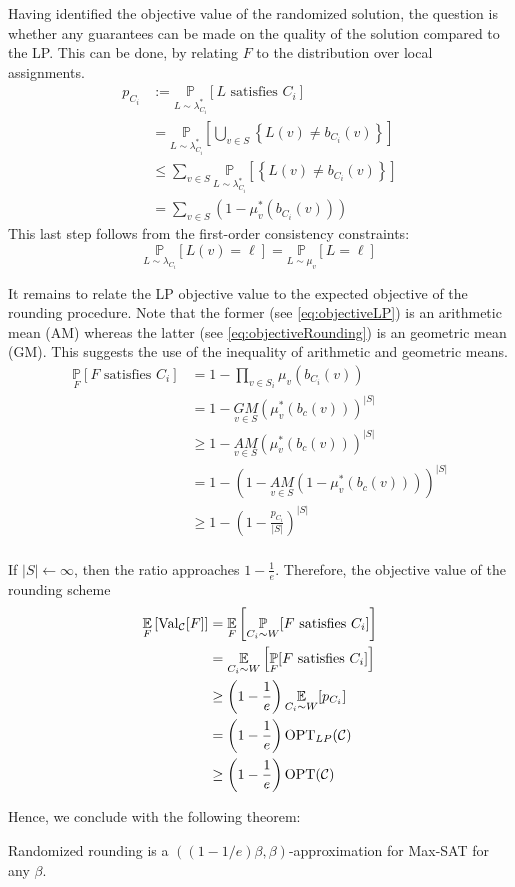 Having identified the objective value of the randomized solution, the question is whether any guarantees can be made on the quality of the solution compared to the LP. 
This can be done, by relating $F$ to the distribution over local assignments.
\begin{align}
	p_{C_i} &:= \underset{L \sim \lambda_{C_i}^*}{\mathbb{P}} [L \text{ satisfies } C_i] \nonumber\\
			&=  \underset{L \sim \lambda_{C_i}^*}{\mathbb{P}}\left[ \bigcup_{v \in S} \left\{ L(v) \neq b_{C_i}(v) \right\} \right] \nonumber\\
			&\le \sum_{v \in  S } \underset{L \sim \lambda_{C_i}^*}{\mathbb{P}} \left[  \left\{ L(v) \neq b_{C_i}(v) \right\} \right] \nonumber\\
			&= \sum_{v \in S} \left( 1 - \mu_v^*(b_{C_i}(v)) \right) \label{eq:objectiveLP}
\end{align}
This last step follows from the first-order consistency constraints:
\[
	\underset{L \sim \lambda_{C_i} }{\mathbb{P}}[ L(v) = \ell] = \underset{L \sim \mu_v }{\mathbb{P}}[ L = \ell]
\]

It remains to relate the LP objective value to the expected objective of the rounding procedure. 
Note that the former (see \eqref{eq:objectiveLP}) is an arithmetic mean (AM) whereas the latter (see \eqref{eq:objectiveRounding}) is an geometric mean (GM). 
This suggests the use of the inequality of arithmetic and geometric means.
\begin{align*}
		\underset{F}{\mathbb{P}}[ F \text{ satisfies } C_i] &= 1 - \prod_{v \in S_i} \mu_v(b_{C_i}(v))\\
		&= 1 - \underset{v \in S}{GM}(\mu_{v}^*(b_c(v)))^{|S|}\\
		&\ge 1 - \underset{v \in S}{AM}(\mu_{v}^*(b_c(v)))^{|S|}\\
		&= 1 - \left( 1  - \underset{v \in S}{AM}(1 -\mu_{v}^*(b_c(v))) \right)^{|S|}\\
		&\ge 1 - \left( 1  - \frac{p_{C_i}}{|S|}\right)^{|S|}\\
\end{align*}

If $|S| \leftarrow \infty$, then the ratio approaches $1 - \frac{1}{e}$. 
Therefore, the objective value of the rounding scheme
\begin{align*}
	\underset{F}{\mathbb{E}} \left[ \text{Val}_{\mathcal{C}}[F]\right] &= \underset{F}{\mathbb{E}}\left[ \underset{C_i \sim W}{\mathbb{P}}[ F \text{ satisfies } C_i] \right]\\
	&=  \underset{C_i \sim W}{\mathbb{E}}\left[ \underset{F}{\mathbb{P}}[ F \text{ satisfies } C_i] \right]\\
	&\ge \left( 1 - \frac{1}{e} \right) \underset{C_i \sim W}{\mathbb{E}} [ p_{C_i} ]\\
	&= \left( 1 - \frac{1}{e} \right) \text{OPT}_{LP}(\mathcal{C})\\
	&\ge \left( 1 - \frac{1}{e} \right) \text{OPT}(\mathcal{C})\\
\end{align*}

Hence, we conclude with the following theorem:
\begin{thm}
	Randomized rounding is a $\left( ( 1 - 1/e)\beta, \beta \right)$-approximation for Max-SAT for any $\beta$.
\end{thm}
